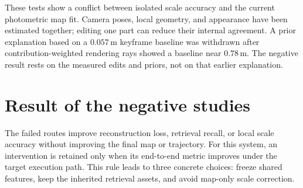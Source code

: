 These tests show a conflict between isolated scale accuracy and the current
photometric map fit. Camera poses, local geometry, and appearance have been
estimated together; editing one part can reduce their internal agreement.
A prior explanation based on a $0.057$\,m keyframe baseline was withdrawn
after contribution-weighted rendering rays showed a baseline near $0.78$\,m.
The negative result rests on the measured edits and priors, not on that
earlier explanation.

\section{Result of the negative studies}
\label{sec:neg:method}

The failed routes improve reconstruction loss, retrieval recall, or local
scale accuracy without improving the final map or trajectory. For this
system, an intervention is retained only when its end-to-end metric improves
under the target execution path. This rule leads to three concrete choices:
freeze shared features, keep the inherited retrieval assets, and avoid
map-only scale correction.
